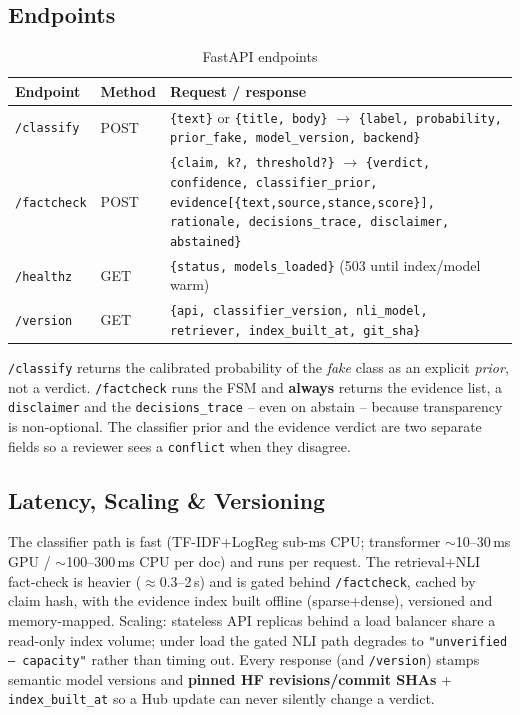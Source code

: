 \documentclass[12pt,a4paper]{article}
\begin{document}
\subsection{Endpoints}

\begin{table}[H]
\centering
\caption{FastAPI endpoints}
\small
\begin{tabularx}{\linewidth}{@{} l l L @{}}
\toprule
\textbf{Endpoint} & \textbf{Method} & \textbf{Request / response} \\
\midrule
\texttt{/classify} & POST & \texttt{\{text\}} or \texttt{\{title, body\}} $\rightarrow$ \texttt{\{label, probability, prior\_fake, model\_version, backend\}} \\
\texttt{/factcheck} & POST & \texttt{\{claim, k?, threshold?\}} $\rightarrow$ \texttt{\{verdict, confidence, classifier\_prior, evidence[\{text,source,stance,score\}], rationale, decisions\_trace, disclaimer, abstained\}} \\
\texttt{/healthz} & GET & \texttt{\{status, models\_loaded\}} (503 until index/model warm) \\
\texttt{/version} & GET & \texttt{\{api, classifier\_version, nli\_model, retriever, index\_built\_at, git\_sha\}} \\
\bottomrule
\end{tabularx}
\end{table}

\noindent \texttt{/classify} returns the calibrated probability of the \emph{fake} class as an explicit \emph{prior}, not a verdict. \texttt{/factcheck} runs the FSM and \textbf{always} returns the evidence list, a \texttt{disclaimer} and the \texttt{decisions\_trace} -- even on abstain -- because transparency is non-optional. The classifier prior and the evidence verdict are two separate fields so a reviewer sees a \texttt{conflict} when they disagree.

\subsection{Latency, Scaling \& Versioning}

The classifier path is fast (TF-IDF+LogReg sub-ms CPU; transformer $\sim$10--30\,ms GPU / $\sim$100--300\,ms CPU per doc) and runs per request. The retrieval+NLI fact-check is heavier ($\approx$0.3--2\,s) and is gated behind \texttt{/factcheck}, cached by claim hash, with the evidence index built offline (sparse+dense), versioned and memory-mapped. Scaling: stateless API replicas behind a load balancer share a read-only index volume; under load the gated NLI path degrades to \texttt{"unverified -- capacity"} rather than timing out. Every response (and \texttt{/version}) stamps semantic model versions and \textbf{pinned HF revisions/commit SHAs} + \texttt{index\_built\_at} so a Hub update can never silently change a verdict.
\end{document}

